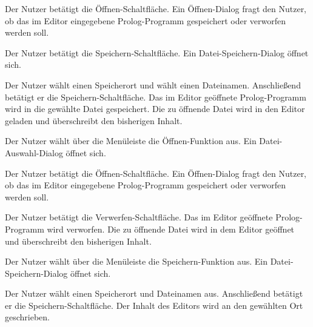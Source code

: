\documentclass[parskip=full,11pt,twoside]{scrartcl}
\begin{document}
{Der Nutzer betätigt die Öffnen-Schaltfläche.}
{Ein Öffnen-Dialog fragt den Nutzer, ob das im Editor eingegebene Prolog-Programm gespeichert oder verworfen werden soll.}

{Der Nutzer betätigt die Speichern-Schaltfläche.}
{Ein Datei-Speichern-Dialog öffnet sich.}

{Der Nutzer wählt einen Speicherort und wählt einen Dateinamen. Anschließend betätigt er die Speichern-Schaltfläche.}
{Das im Editor geöffnete Prolog-Programm wird in die gewählte Datei gespeichert. Die zu öffnende Datei wird in den Editor geladen und überschreibt den bisherigen Inhalt.}


{Der Nutzer wählt über die Menüleiste die Öffnen-Funktion aus.}
{Ein Datei-Auswahl-Dialog öffnet sich.}

{Der Nutzer betätigt die Öffnen-Schaltfläche.}
{Ein Öffnen-Dialog fragt den Nutzer, ob das im Editor eingegebene Prolog-Programm gespeichert oder verworfen werden soll.}

{Der Nutzer betätigt die Verwerfen-Schaltfläche.}
{Das im Editor geöffnete Prolog-Programm wird verworfen. Die zu öffnende Datei wird in dem Editor geöffnet und überschreibt den bisherigen Inhalt.}


{Der Nutzer wählt über die Menüleiste die Speichern-Funktion aus.}
{Ein Datei-Speichern-Dialog öffnet sich.}

{Der Nutzer wählt einen Speicherort und Dateinamen aus. Anschließend betätigt er die Speichern-Schaltfläche.}
{Der Inhalt des Editors wird an den gewählten Ort geschrieben.}
\end{document}
